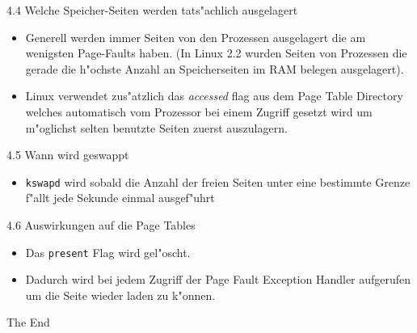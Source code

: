 \documentclass[landscape]{slides}
\begin{document}
%
%
%
\begin{slide}{4.4 Welche Speicher-Seiten werden tats"achlich ausgelagert}
\begin{itemize}
\item Generell werden immer Seiten von den Prozessen ausgelagert die am wenigsten Page-Faults haben. (In Linux 2.2 wurden Seiten von Prozessen die gerade die h"ochste Anzahl an Speicherseiten im RAM belegen ausgelagert).
\item Linux verwendet zus"atzlich das \textit{accessed} flag aus dem Page Table Directory welches automatisch vom Prozessor bei einem Zugriff gesetzt wird um m"oglichst selten benutzte Seiten zuerst auszulagern.
\end{itemize}
\end{slide}
%
%
%
\begin{slide}{4.5 Wann wird geswappt}
\begin{itemize}
\item \texttt{kswapd} wird sobald die Anzahl der freien Seiten unter eine bestimmte Grenze f"allt jede Sekunde einmal ausgef"uhrt
\end{itemize}
\end{slide}
%
%
%
\begin{slide}{4.6 Auswirkungen auf die Page Tables}
\begin{itemize}
\item Das \texttt{present} Flag wird gel"oscht.
\item Dadurch wird bei jedem Zugriff der Page Fault Exception Handler aufgerufen um die Seite wieder laden zu k"onnen.
\end{itemize}
\end{slide}
%

\begin{slide}{}
The End
\end{slide}
\end{document}
